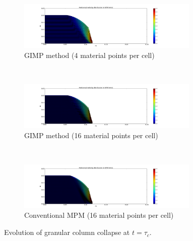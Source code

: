 \begin{figure}[tbhp]
	\centering
	\begin{subfigure}[b]{0.95\textwidth}
		\centering
		\includegraphics[width=0.95\textwidth]{4GIMPM_tc}
		\caption{GIMP method (4 material points per cell)}
		\label{fig:4GIMPM_tc}
	\end{subfigure} \\
	\begin{subfigure}[b]{0.95\textwidth}
		\centering
		\includegraphics[width=0.95\textwidth]{16GIMPM_tc}
		\caption{GIMP method (16 material points per cell)}
		\label{fig:16GIMPM_tc}
	\end{subfigure} \\
	\begin{subfigure}[b]{0.95\textwidth}
		\centering
		\includegraphics[width=0.95\textwidth]{16MPM_tc}
		\caption{Conventional MPM (16 material points per cell)}
		\label{fig:16MPM_tc}
	\end{subfigure}
	\caption{Evolution of granular column collapse at $t = \tau_c$.}
	\label{fig:MPM_GIMP_TC}
\end{figure}

